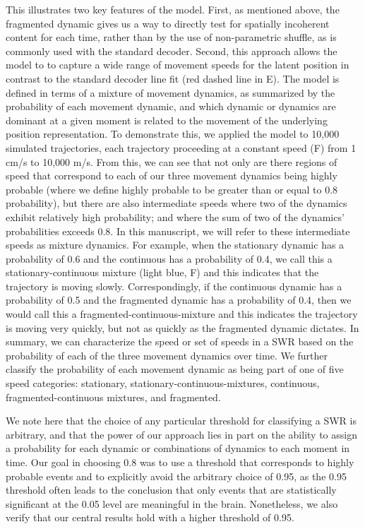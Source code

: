 \documentclass[9pt,lineno]{elife}
\begin{document}
This illustrates two key features of the model. First, as mentioned above, the fragmented dynamic gives us a way to directly test for spatially incoherent content for each time, rather than by the use of non-parametric shuffle, as is commonly used with the standard decoder. Second, this approach allows the model to to capture a wide range of movement speeds for the latent position in contrast to the standard decoder line fit (red dashed line in E). The model is defined in terms of a mixture of movement dynamics, as summarized by the probability of each movement dynamic, and which dynamic or dynamics are dominant at a given moment is related to the movement of the underlying position representation. To demonstrate this, we applied the model to 10,000 simulated trajectories, each trajectory proceeding at a constant speed (F) from 1 cm/s to 10,000 m/s. From this, we can see that not only are there regions of speed that correspond to each of our three movement dynamics being highly probable (where we define highly probable to be greater than or equal to 0.8 probability), but there are also intermediate speeds where two of the dynamics exhibit relatively high probability; and where the sum of two of the dynamics' probabilities exceeds 0.8. In this manuscript, we will refer to these intermediate speeds as mixture dynamics. For example, when the stationary dynamic has a probability of 0.6 and the continuous has a probability of 0.4, we call this a stationary-continuous mixture (light blue, F) and this indicates that the trajectory is moving slowly. Correspondingly, if the continuous dynamic has a probability of 0.5 and the fragmented dynamic has a probability of 0.4, then we would call this a fragmented-continuous-mixture and this indicates the trajectory is moving very quickly, but not as quickly as the fragmented dynamic dictates. In summary, we can characterize the speed or set of speeds in a SWR based on the probability of each of the three movement dynamics over time. We further classify the probability of each movement dynamic as being part of one of five speed categories: stationary, stationary-continuous-mixtures, continuous, fragmented-continuous mixtures, and fragmented.

We note here that the choice of any particular threshold for classifying a SWR is arbitrary, and that the power of our approach lies in part on the ability to assign a probability for each dynamic or combinations of dynamics to each moment in time. Our goal in choosing 0.8 was to use a threshold that corresponds to highly probable events and to explicitly avoid the arbitrary choice of 0.95, as the 0.95 threshold often leads to the conclusion that only events that are statistically significant at the 0.05 level are meaningful in the brain. Nonetheless, we also verify that our central results hold with a higher threshold of 0.95. 
\end{document}
